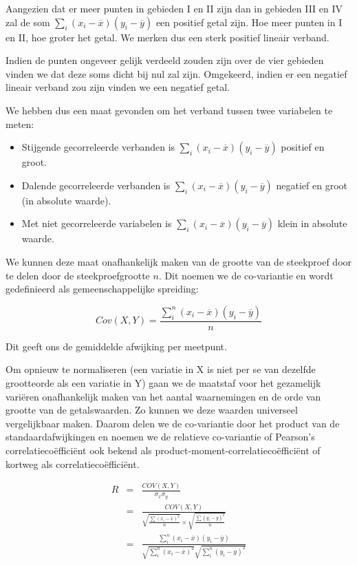 Aangezien dat er meer punten in gebieden I en II zijn dan in gebieden III en IV zal de som $\sum_{i} (x_{i} - \overline{x}) (y_{i} - \overline{y})$ een positief getal zijn. Hoe meer punten in I en II, hoe groter het getal. We merken dus een sterk positief lineair verband.

Indien de punten ongeveer gelijk verdeeld zouden zijn over de vier gebieden vinden we dat deze soms dicht bij nul zal zijn. Omgekeerd, indien er een negatief lineair verband zou zijn vinden we een negatief getal.

We hebben dus een maat gevonden om het verband tussen twee variabelen te meten:

\begin{itemize}
  \item Stijgende gecorreleerde verbanden is $\sum_{i} (x_{i} - \overline{x}) (y_{i} - \overline{y})$ positief en groot.
  \item Dalende gecorreleerde verbanden is $\sum_{i} (x_{i} - \overline{x}) (y_{i} - \overline{y})$ negatief en groot (in absolute waarde).
  \item Met niet gecorreleerde variabelen is $\sum_{i} (x_{i} - \overline{x}) (y_{i} - \overline{y})$ klein in absolute waarde.
\end{itemize}

We kunnen deze maat onafhankelijk maken van de grootte van de steekproef door te delen door de steekproefgrootte $n$. Dit noemen we de co-variantie en wordt gedefinieerd als gemeenschappelijke spreiding:

\begin{equation}
  Cov(X,Y) = \frac{\sum_{i}^{n}(x_{i} - \overline{x}) (y_{i} - \overline{y})}{n}
  \label{eq:covariantie}
\end{equation}

Dit geeft ons de gemiddelde afwijking per meetpunt.

Om opnieuw te normaliseren (een variatie in X is niet per se van dezelfde grootteorde als een variatie in Y) gaan we de maatstaf voor het gezamelijk vari\"eren onafhankelijk maken van het aantal waarnemingen en de orde van grootte van de getalswaarden. Zo kunnen we deze waarden universeel vergelijkbaar maken. Daarom delen we de co-variantie door het product van de standaardafwijkingen en noemen we de relatieve co-variantie of Pearson's correlatieco\"effici\"ent ook bekend als product-moment-correlatieco\"effici\"ent of kortweg als correlatieco\"effici\"ent.

\begin{eqnarray}
  R &=&\frac{COV(X,Y)}{\sigma_{x}\sigma_{y}} \\
  &=& \frac{COV(X,Y)}{\sqrt{\frac{\sum(x_{i} - \overline{x})^{2}}{n}} \times \sqrt{\frac{\sum(y_{i} - \overline{y})^{2}}{n}}} \\
  &=& \frac{\sum_{i}^{n}(x_{i}-\overline{x})(y_{i} - \overline{y})}{\sqrt{\sum_{i}^{n} (x_{i}-\overline{x})^{2}} \sqrt{\sum_{i}^{n} (y_{i}-\overline{y})^{2}}}
  \label{eq:relCovar}
\end{eqnarray}

